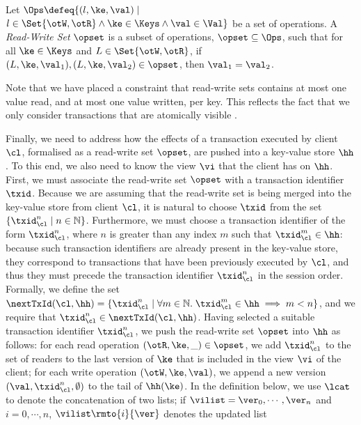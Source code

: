 \begin{definition}
Let 
$\Ops \defeq \{(l, \ke, \val) \mid$ $ l \in \Set{\otW, \otR} \land \ke \in \Keys \wedge \val \in \Val \}$ 
be a set of operations. 
A \emph{Read-Write Set} $\opset$ is a subset of operations, $\opset \subseteq \Ops$,
such that for all $\ke \in \Keys$ and \( L \in \Set{\otW, \otR} \),
if $(L, \ke, \val_1), (L, \ke, \val_2) \in \opset$, then $\val_1 = \val_2$.
\end{definition}
Note that we have placed a constraint that read-write sets contains at most one value read, 
and at most one value written, per key. This reflects the fact that we only consider transactions 
that are atomically visible \cite{laws}.

Finally, we need to address how the effects of a transaction executed by client $\cl$, formalised 
as a read-write set $\opset$, are pushed into a key-value store $\hh$. To this end, we also 
need to know the view $\vi$ that the client has on $\hh$.
First, we must associate the read-write set $\opset$ with a transaction identifier $\txid$.  
Because we are assuming that the read-write set is being merged into the key-value store from client $\cl$, 
it is natural to choose $\txid$ from the set $\{\txid_{\cl}^{n} \mid n \in \mathbb{N}\}$. 
Furthermore, we must choose a transaction identifier of the form 
$\txid_{\cl}^{n}$, where $n$ is greater than any index $m$ such that 
$\txid_{\cl}^{m} \in \hh$: because such transaction identifiers are already present 
in the key-value store, they correspond to transactions that have been previously executed 
by $\cl$, and thus they must precede the transaction identifier $\txid_{\cl}^{n}$ in the session 
order. Formally, we define the set $\nextTxId(\cl, \hh) = \{ \txid_{\cl}^{n} \mid \forall m \in \mathbb{N}. \; 
\txid_{\cl}^{m} \in \hh \implies m < n\}$, and we require that $\txid_{\cl}^{n} \in \nextTxId(\cl,\hh)$. 
Having selected a suitable transaction identifier $\txid_{\cl}^{n}$, we push the read-write set $\opset$ 
into $\hh$ as follows: for each read operation $(\otR, \ke, \_) \in \opset$, we add $\txid_{\cl}^{n}$ 
to the set of readers to the last version of $\ke$ that is included in the view $\vi$ of the client; 
for each write operation $(\otW, \ke, \val)$, we append a new version $(\val, \txid_{\cl}^{n}, \emptyset)$ 
to the tail of $\hh(\ke)$.
In the definition below, we use $\lcat$ to denote the concatenation of two lists; 
if $\vilist = \ver_0, \cdots, \ver_n$ and $i=0,\cdots,n$, 
$\vilist\rmto{i}{\ver}$ denotes the updated list 
